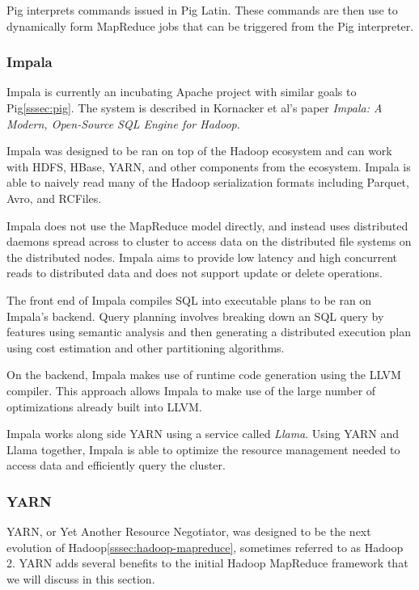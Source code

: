 \documentclass[]{article}
\begin{document}
Pig interprets commands issued in Pig Latin. These commands are then use to dynamically form MapReduce jobs that can be triggered from the Pig interpreter.

\subsubsection{Impala}\label{sssec:impala}
Impala\cite{impala} is currently an incubating Apache project with similar goals to Pig\ref{sssec:pig}. The system is described in Kornacker et al's paper \textit{Impala: A Modern, Open-Source SQL Engine for Hadoop}\cite{kornacker2015impala}.

Impala was designed to be ran on top of the Hadoop ecosystem and can work with HDFS, HBase, YARN, and other components from the ecosystem. Impala is able to naively read many of the Hadoop serialization formats including Parquet, Avro, and RCFiles.

Impala does not use the MapReduce model directly, and instead uses distributed daemons spread across to cluster to access data on the distributed file systems on the distributed nodes. Impala aims to provide low latency and high concurrent reads to distributed data and does not support update or delete operations. 

The front end of Impala compiles SQL into executable plans to be ran on Impala's backend. Query planning involves breaking down an SQL query by features using semantic analysis and then generating a distributed execution plan using cost estimation and other partitioning algorithms.

On the backend, Impala makes use of runtime code generation using the LLVM compiler. This approach allows Impala to make use of the large number of optimizations already built into LLVM.

Impala works along side YARN using a service called \textit{Llama}. Using YARN and Llama together, Impala is able to optimize the resource management needed to access data and efficiently query the cluster.

\subsubsection{YARN}\label{sssec:yarn}
YARN, or Yet Another Resource Negotiator\cite{vavilapalli2013apache}, was designed to be the next evolution of Hadoop\ref{sssec:hadoop-mapreduce}, sometimes referred to as Hadoop 2. YARN adds several benefits to the initial Hadoop MapReduce framework that we will discuss in this section.
\end{document}

